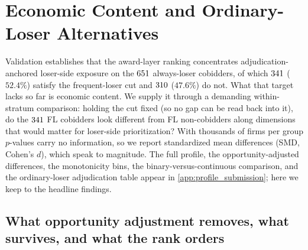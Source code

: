 %
%
\section{Economic Content and Ordinary-Loser Alternatives}
\label{sec:cobidder_type}

Validation establishes that the award-layer ranking concentrates
adjudication-anchored loser-side exposure on the $651$
always-loser cobidders, of which $341$ ($52.4\%$) satisfy the
frequent-loser cut and $310$ ($47.6\%$) do not. What that
target lacks so far is economic content. We supply it through a
demanding within-stratum comparison: holding the cut fixed (so no gap
can be read back into it), do the $341$ FL cobidders look
different from FL non-cobidders along dimensions that would matter for
loser-side prioritization? With thousands of firms per group $p$-values
carry no information, so we report standardized mean differences (SMD,
Cohen's $d$), which speak to magnitude. The full profile, the
opportunity-adjusted differences, the monotonicity bins, the
binary-versus-continuous comparison, and the ordinary-loser
adjudication table appear in \ref{app:profile_submission}; here we keep
to the headline findings.

\subsection{What opportunity adjustment removes, what survives, and what the rank orders}
\label{sec:profile_5_1}

